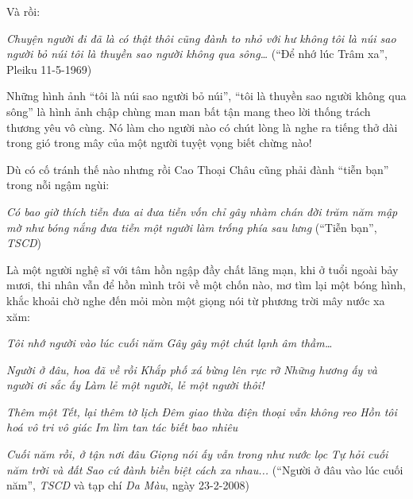 \documentclass[../main.tex]{subfiles}
\begin{document}
\begin{multicols}{2}
\begin{blockquote}
\end{blockquote}
 
Và rồi: 
\begin{blockquote}
        
\textit{Chuyện người đi đã là có thật}        
\textit{thôi cũng đành to nhỏ với hư không}        
\textit{tôi là núi sao người bỏ núi}        
\textit{tôi là thuyền sao người không qua sông…}        
(“Để nhớ lúc Trâm xa”, Pleiku 11-5-1969)  

\end{blockquote}
 
Những hình ảnh “tôi là núi sao người bỏ núi”, “tôi là thuyền sao người không qua sông” là hình ảnh chập chùng man man bất tận mang theo lời thống trách thương yêu vô cùng. Nó làm cho người nào có chút lòng là nghe ra tiếng thở dài trong gió trong mây của một người tuyệt vọng biết chừng nào! 
 
Dù có cố tránh thế nào nhưng rồi Cao Thoại Châu cũng phải đành “tiễn bạn” trong nỗi ngậm ngùi: 
\begin{blockquote}
        
\textit{Có bao giờ thích tiễn đưa ai}        
\textit{đưa tiễn vốn chỉ gây nhàm chán}        
\textit{đời trăm năm mập mờ như bóng nắng}        
\textit{đưa tiễn một người làm trống phía sau lưng}        
(“Tiễn bạn”, \textit{TSCD}) 

\end{blockquote}
 
Là một người nghệ sĩ với tâm hồn ngập đầy chất lãng mạn, khi ở tuổi ngoài bảy mươi, thi nhân vẫn để hồn mình trôi về một chốn nào, mơ tìm lại một bóng hình, khắc khoải chờ nghe đến mỏi mòn một giọng nói từ phương trời mây nước xa xăm: 
\begin{blockquote}
        
\textit{Tôi nhớ người vào lúc cuối năm} 
\textit{Gây gây một chút lạnh âm thầm…} 
        
\textit{Người ở đâu, hoa đã về rồi}        
\textit{Khắp phố xá bừng lên rực rỡ}        
\textit{Những hương ấy và người ơi sắc ấy} 
\textit{Làm lẻ một người, lẻ một người thôi!} 
        
\textit{Thêm một Tết, lại thêm tờ lịch}        
\textit{Đêm giao thừa điện thoại vẫn không reo}        
\textit{Hồn tôi hoá vô tri vô giác} 
\textit{Im lìm tan tác biết bao nhiêu} 
        
\textit{Cuối năm rồi, ở tận nơi đâu}        
\textit{Giọng nói ấy vẫn trong như nước lọc}        
\textit{Tự hỏi cuối năm trời và đất}        
\textit{Sao cứ đành biền biệt cách xa nhau...}        
(“Người ở đâu vào lúc cuối năm”, \textit{TSCD} và tạp chí \textit{Da Màu}, ngày 23-2-2008) 


\end{blockquote}
\end{multicols}
\end{document}
